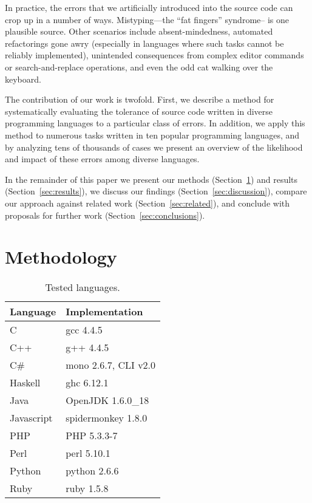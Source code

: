 \documentclass[10pt]{sigplanconf}
\begin{document}
In practice,
the errors that we artificially introduced into the source code can
crop up in a number of ways.
Mistyping---the ``fat fingers'' syndrome-- is one plausible source.
Other scenarios include
absent-mindedness,
automated refactorings gone awry
(especially in languages where such tasks cannot be reliably implemented),
unintended consequences from complex editor commands or
search-and-replace operations,
and even the odd cat walking over the keyboard.

The contribution of our work is twofold.
First, we describe a method for systematically evaluating the tolerance
of source code written in diverse programming languages to a particular
class of errors.
In addition, we apply this method to numerous tasks written in ten popular
programming languages,
and by analyzing tens of thousands of cases we present an overview of
the likelihood and impact of these errors among diverse languages.

In the remainder of this paper we present our
methods (Section~\ref{sec:method}) and
results (Section~\ref{sec:results}),
we discuss our findings (Section~\ref{sec:discussion}),
compare our approach against related work
(Section~\ref{sec:related}),
and conclude with proposals for further work
(Section~\ref{sec:conclusions}).

\section{Methodology} %
\label{sec:method}

\begin{table}
\begin{center}
\begin{tabular}{ l l}
Language & Implementation \\
\hline
C 			& gcc 4.4.5 \\
C++ 		& g++ 4.4.5 \\
C\# 		& mono 2.6.7, CLI v2.0 \\
Haskell 	& ghc 6.12.1 \\
Java 		& OpenJDK 1.6.0\_18 \\
Javascript 	& spidermonkey 1.8.0 \\
PHP 		& PHP 5.3.3-7 \\
Perl 		& perl 5.10.1 \\
Python 		& python 2.6.6 \\
Ruby 		& ruby 1.5.8 \\
\end{tabular}
\end{center}
\caption{Tested languages.}
\label{tab:langs}
\end{table}
\end{document}
